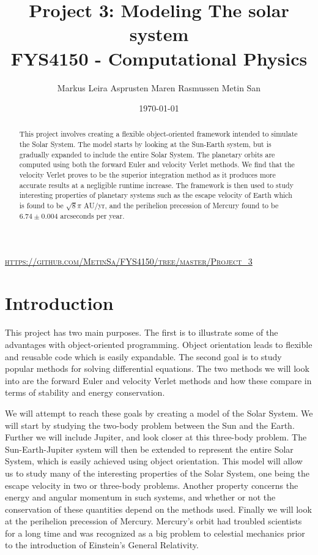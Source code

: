 \documentclass[a4paper, 10pt, reqno]{amsart}
\title[Modeling The Solar System]{\Large{Project 3: Modeling The solar system} \\
\normalsize{FYS4150 - Computational Physics}}
\author[Asprusten \& Rasmussen \& San]{Markus Leira Asprusten \qquad Maren Rasmussen \qquad Metin San}
\date{\today}
\begin{document}
\maketitle
\begin{center}
    \textsc{\url{https://github.com/MetinSa/FYS4150/tree/master/Project_3}}
\end{center}
\begin{abstract}
This project involves creating a flexible object-oriented framework intended to simulate the Solar System. The model starts by looking at the Sun-Earth system, but is gradually expanded to include the entire Solar System. The planetary orbits are computed using both the forward Euler and velocity Verlet methods. We find that the velocity Verlet proves to be the superior integration method as it produces more accurate results at a negligible runtime increase. The framework is then used to study interesting properties of planetary systems such as the escape velocity of Earth which is found to be $\sqrt{8}\pi$ AU/yr, and the perihelion precession of Mercury found to be $6.74 \pm 0.004$ arcseconds per year.
\end{abstract}

\section{Introduction}
This project has two main purposes. The first is to illustrate some of the advantages with object-oriented programming. Object orientation leads to flexible and reusable code which is easily expandable. The second goal is to study popular methods for solving differential equations. The two methods we will look into are the forward Euler and velocity Verlet methods and how these compare in terms of stability and energy conservation. 

We will attempt to reach these goals by creating a model of the Solar System. We will start by studying the two-body problem between the Sun and the Earth. Further we will include Jupiter, and look closer at this three-body problem. The Sun-Earth-Jupiter system will then be extended to represent the entire Solar System, which is easily achieved using object orientation. This model will allow us to study many of the interesting properties of the Solar System, one being the escape velocity in two or three-body problems. Another property concerns the energy and angular momentum in such systems, and whether or not the conservation of these quantities depend on the methods used. Finally we will look at the perihelion precession of Mercury. Mercury's orbit had troubled scientists for a long time and was recognized as a big problem to celestial mechanics prior to the introduction of Einstein's General Relativity.
\end{document}
